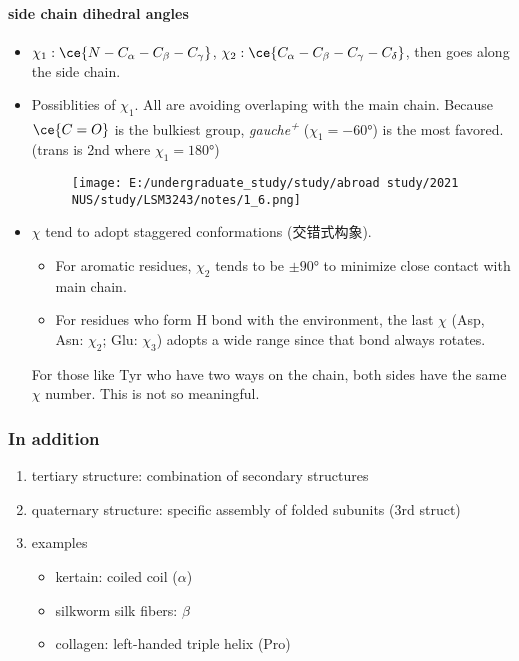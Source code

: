 \documentclass[]{article}
\let\oldparagraph\paragraph
\renewcommand{\paragraph}[1]{\oldparagraph{#1}\mbox{}}
\begin{document}
\hypertarget{side-chain-dihedral-angles}{%
\paragraph{side chain dihedral
angles}\label{side-chain-dihedral-angles}}

\begin{itemize}
\item
  \(\chi_1: \ce{N-C_\alpha-C_\beta-C_\gamma}\),
  \(\chi_2: \ce{C_\alpha-C_\beta-C_\gamma-C_\delta}\), then goes along
  the side chain.
\item
  Possiblities of \(\chi_1\). All are avoiding overlaping with the main
  chain. Because \(\ce{C=O}\) is the bulkiest group,
  \emph{gauche\textsuperscript{+}} (\(\chi_1=-60°\)) is the most
  favored. (trans is 2nd where \(\chi_1=180°\))

  \begin{figure}
  \centering
  \texttt{[image: E:/undergraduate\_study/study/abroad study/2021 NUS/study/LSM3243/notes/1\_6.png]}
  \caption{}
  \end{figure}
\item
  \(\chi\) tend to adopt staggered conformations (交错式构象).

  \begin{itemize}
  \item
    For aromatic residues, \(\chi_2\) tends to be \(\pm 90°\) to
    minimize close contact with main chain.
  \item
    For residues who form H bond with the environment, the last \(\chi\)
    (Asp, Asn: \(\chi_2\); Glu: \(\chi_3\)) adopts a wide range since
    that bond always rotates.
  \end{itemize}

   For those like Tyr who have two ways on the chain, both sides have
  the same \(\chi\) number. This is not so meaningful.
\end{itemize}

\hypertarget{in-addition-1}{%
\subsubsection{In addition}\label{in-addition-1}}

\begin{enumerate}
\def\labelenumi{\arabic{enumi}.}
\item
  tertiary structure: combination of secondary structures
\item
  quaternary structure: specific assembly of folded subunits (3rd
  struct)
\item
  examples

  \begin{itemize}
  \item
    kertain: coiled coil (\(\alpha\))
  \item
    silkworm silk fibers: \(\beta\)
  \item
    collagen: left-handed triple helix (Pro)
  \end{itemize}
\end{enumerate}
\end{document}
